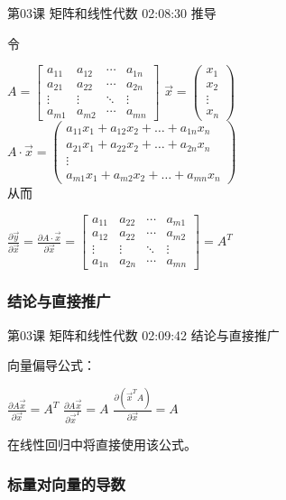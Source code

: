 \documentclass[UTF8]{ctexbook}
\begin{document}
第03课 矩阵和线性代数 02:08:30 推导

令

$A=
\begin{bmatrix}
a_{11} & a_{12} & \cdots & a_{1n} \\
a_{21} & a_{22} & \cdots & a_{2n} \\
\vdots & \vdots & \ddots & \vdots \\
a_{m1} & a_{m2} & \cdots & a_{mn}
\end{bmatrix}$ \quad
$\vec{x}=
\begin{pmatrix}
x_{1} \\
x_{2} \\
\vdots \\
x_{n}
\end{pmatrix}$\\

$A \cdot \vec{x}=
\begin{pmatrix}
a_{11}x_{1} + a_{12}x_{2}+\dots + a_{1n}x_{n} \\
a_{21}x_{1} + a_{22}x_{2}+\dots + a_{2n}x_{n} \\
\vdots \\
a_{m1}x_{1} + a_{m2}x_{2}+\dots + a_{mn}x_{n}
\end{pmatrix}$\\

从而

$\frac{\partial \vec{y}}{\partial \vec{x}}=\frac{\partial A \cdot \vec{x}}{\partial \vec{x}}=
\begin{bmatrix}
a_{11} & a_{22} & \cdots & a_{m1} \\
a_{12} & a_{22} & \cdots & a_{m2} \\
\vdots & \vdots & \ddots & \vdots \\
a_{1n} & a_{2n} & \cdots & a_{mn}
\end{bmatrix}
=A^{T}$

\subsubsection{结论与直接推广}

第03课 矩阵和线性代数 02:09:42 结论与直接推广

向量偏导公式：

$\frac{\partial A \vec{x}}{\partial \vec{x}}=A^{T}$ \quad
$\frac{\partial A \vec{x}}{\partial \vec{x}^{T}}=A$ \quad
$\frac{\partial (\vec{x}^{T} A)}{\partial \vec{x}}=A$ \quad

在线性回归中将直接使用该公式。

\subsubsection{标量对向量的导数}
\end{document}
